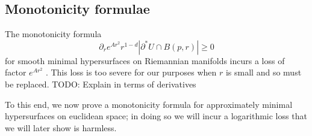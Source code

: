 \documentclass[reqno,12pt,letterpaper]{amsart}
\theoremstyle{definition}
\numberwithin{equation}{section}
\begin{document}

\subsection{Monotonicity formulae}\label{inequalities}
The monotonicity formula
\begin{equation}\label{classic monotonicity formula}
\partial_r e^{Ar^2}r^{1 - d} |\partial^* U \cap B(p, r)| \geq 0
\end{equation}
for smooth minimal hypersurfaces on Riemannian manifolds incurs a loss of factor $e^{Ar^2}$ \cite[\S7]{MarquesXX}.
This loss is too severe for our purposes when $r$ is small and so must be replaced. TODO: Explain in terms of derivatives

To this end, we now prove a monotonicity formula for approximately minimal hypersurfaces on euclidean space; in doing so we will incur a logarithmic loss that we will later show is harmless.
\end{document}
